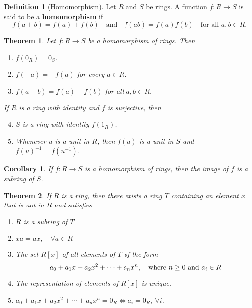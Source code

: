 \documentclass{article}
\newtheorem{theorem}{Theorem}[section]
\newtheorem{corollary}{Corollary}[section]
\theoremstyle{definition}
\newtheorem{definition}{Definition}[section]
\theoremstyle{remark}
\begin{document}
\begin{definition}[Homomorphism]
Let $R$ and $S$ be rings. A function $f: R \to S$ is said to be a \textbf{homomorphism} if
\[
f(a + b) = f(a) + f(b) \quad \text{and} \quad f(ab) = f(a) f(b) \quad \text{for all } a, b \in R.
\]
\end{definition}










\begin{theorem}\label{thm:homomorphism property}
Let $f: R \to S$ be a homomorphism of rings. Then
\begin{enumerate}
\item $f(0_R) = 0_S$.
\item $f(-a) = -f(a)$ for every $a \in R$.
\item $f(a - b) = f(a) - f(b)$ for all $a, b \in R$.
\end{enumerate}
If $R$ is a ring with identity and $f$ is surjective, then
\begin{enumerate}
\setcounter{enumi}{3}
\item $S$ is a ring with identity $f(1_R)$.
\item Whenever $u$ is a unit in $R$, then $f(u)$ is a unit in $S$ and $f(u)^{-1} = f(u^{-1})$.
\end{enumerate}
\end{theorem}                





\begin{corollary}
If $f: R \to S$ is a homomorphism of rings, then the image of $f$ is a subring of $S$.
\end{corollary}






\begin{theorem}
If $R$ is a ring, then there exists a ring $T$ containing an element
$x$ that is not in $R$ and satisfies
\begin{enumerate}
\item $R$ is a subring of $T$
\item $xa = ax, \quad \forall a \in R$
\item The set $R[x]$ of all elements of $T$ of the form \[
a_0 + a_1x + a_2x^2 + \cdots + a_nx^n, \quad \textnormal{where } n \geq 0 \textnormal{ and } a_i \in R
\]
\item The representation of elements of $R[x]$ is unique.
\item $a_0 + a_1x + a_2x^2 + \cdots + a_nx^n = 0_R \iff a_i = 0_R, \ \forall i$.
\end{enumerate}
\end{theorem}
\end{document}
